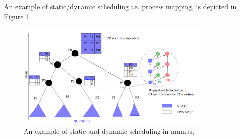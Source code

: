 An example of static/dynamic scheduling i.e. process mapping, is depicted in Figure \ref{fig:mumps:mapping-and-scheduling}.\\


\begin{figure}[!htpb]
  \centering
  \includegraphics[width=0.85\textwidth]{figures/chapter-2/mumps-task-data-parallelism-2.png}
    \caption[An example of static and dynamic scheduling in \acrshort{mumps}]{An example of static and dynamic scheduling in \acrshort{mumps}, \cite{l2012multifrontal}}
\label{fig:mumps:mapping-and-scheduling}
\end{figure}


